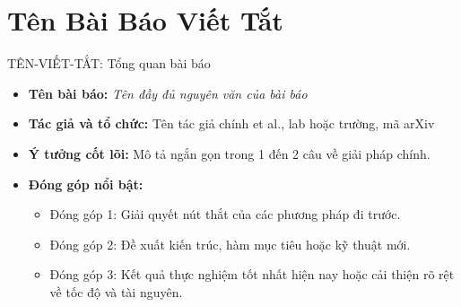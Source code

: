 
\section{Tên Bài Báo Viết Tắt}

\begin{frame}{TÊN-VIẾT-TẮT: Tổng quan bài báo}
    \begin{itemize}
        \item \textbf{Tên bài báo:} \textit{Tên đầy đủ nguyên văn của bài báo}
        \item \textbf{Tác giả và tổ chức:} Tên tác giả chính et al., lab hoặc trường, mã arXiv
        \item \textbf{Ý tưởng cốt lõi:} Mô tả ngắn gọn trong 1 đến 2 câu về giải pháp chính.
        \item \textbf{Đóng góp nổi bật:}
        \begin{itemize}
            \item Đóng góp 1: Giải quyết nút thắt của các phương pháp đi trước.
            \item Đóng góp 2: Đề xuất kiến trúc, hàm mục tiêu hoặc kỹ thuật mới.
            \item Đóng góp 3: Kết quả thực nghiệm tốt nhất hiện nay hoặc cải thiện rõ rệt về tốc độ và tài nguyên.
        \end{itemize}
    \end{itemize}
\end{frame}

